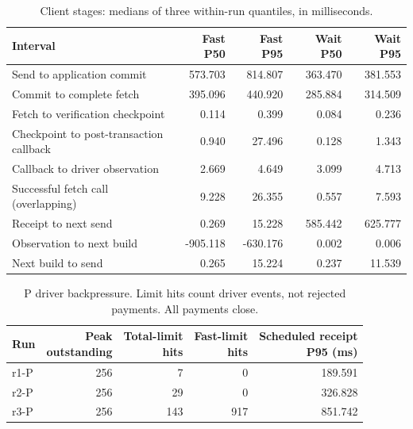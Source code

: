 \begin{table}[htbp]
\centering\small
\caption{Client stages: medians of three within-run quantiles, in milliseconds.}
\label{tab:final-evidence-stages}
\begin{tabular}{lrrrr}\toprule
Interval & Fast P50 & Fast P95 & Wait P50 & Wait P95 \\\midrule
Send to application commit & 573.703 & 814.807 & 363.470 & 381.553 \\
Commit to complete fetch & 395.096 & 440.920 & 285.884 & 314.509 \\
Fetch to verification checkpoint & 0.114 & 0.399 & 0.084 & 0.236 \\
Checkpoint to post-transaction callback & 0.940 & 27.496 & 0.128 & 1.343 \\
Callback to driver observation & 2.669 & 4.649 & 3.099 & 4.713 \\
Successful fetch call (overlapping) & 9.228 & 26.355 & 0.557 & 7.593 \\
Receipt to next send & 0.269 & 15.228 & 585.442 & 625.777 \\
Observation to next build & -905.118 & -630.176 & 0.002 & 0.006 \\
Next build to send & 0.265 & 15.224 & 0.237 & 11.539 \\
\bottomrule\end{tabular}
\end{table}


\begin{table}[htbp]
\centering\small
\caption{P driver backpressure. Limit hits count driver events, not rejected payments. All payments close.}
\label{tab:final-evidence-pressure}
\begin{tabular}{lrrrr}\toprule
Run & \shortstack{Peak\\outstanding} & \shortstack{Total-limit\\hits} & \shortstack{Fast-limit\\hits} & \shortstack{Scheduled receipt\\P95 (ms)} \\\midrule
r1-P & 256 & 7 & 0 & 189.591 \\
r2-P & 256 & 29 & 0 & 326.828 \\
r3-P & 256 & 143 & 917 & 851.742 \\
\bottomrule\end{tabular}
\end{table}

\clearpage
\begingroup
\small
\setlength{\tabcolsep}{3pt}
\setlength{\LTleft}{0pt}
\setlength{\LTright}{0pt}
\setlength{\LTcapwidth}{\textwidth}
\renewcommand{\arraystretch}{1.10}

